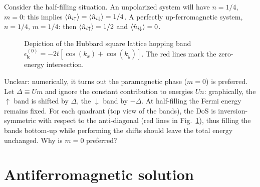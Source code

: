 Consider the half-filling situation. An unpolarized system will have $n=1/4$, $m=0$: this implies $\ev{\hat n_{i\uparrow}} = \ev{\hat n_{i\downarrow}} = 1/4$. A perfectly up-ferromagnetic system, $n=1/4$, $m=1/4$: then $\ev{\hat n_{i\uparrow}} = 1/2$ and $\ev{\hat n_{i\downarrow}} = 0$. \todo

\begin{figure}
	\centering
	
	\caption{Depiction of the Hubbard square lattice hopping band $\epsilon_{\mathbf{k}}^{(0)} = -2t[\cos(k_x) + \cos(k_y)]$. The red lines mark the zero-energy intersection.}
	\label{appfig:ferromagnetic-3d-band}
\end{figure}

{\color{tabred} Unclear: numerically, it turns out the paramagnetic phase ($m=0$) is preferred. Let $\Delta \equiv Um$ and ignore the constant contribution to energies $Un$: graphically, the $\uparrow$ band is shifted by $\Delta$, the $\downarrow$ band by $-\Delta$. At half-filling the Fermi energy remains fixed. For each quadrant (top view of the bands), the DoS is inversion-symmetric with respect to the anti-diagonal (red lines in Fig.~\ref{appfig:ferromagnetic-3d-band}), thus filling the bands bottom-up while performing the shifts should leave the total energy unchanged. Why is $m=0$ preferred?}

\section{Antiferromagnetic solution}

